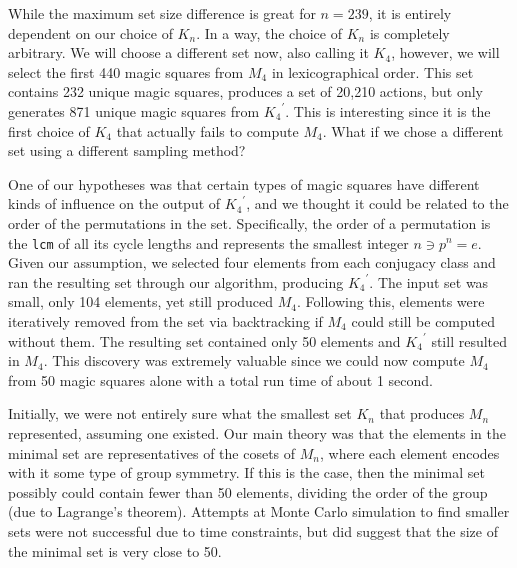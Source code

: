 \documentclass[12pt]{report}
\begin{document}
\par While the maximum set size difference is great for $n=239$, it is entirely dependent on our
choice of $K_n$. In a way, the choice of $K_n$ is completely arbitrary. We will choose a different
set now, also calling it $K_4$, however, we will select the first 440 magic squares from $M_4$ in
lexicographical order. This set contains 232 unique magic squares, produces a set of 20,210
actions, but only generates 871 unique magic squares from ${K_4}^\prime$. This is interesting since
it is the first choice of $K_4$ that actually fails to compute $M_4$. What if we chose a different
set using a different sampling method?

\par One of our hypotheses was that certain types of magic squares have different kinds of
influence on the output of ${K_4}^\prime$, and we thought it could be related to the order of the
permutations in the set. Specifically, the order of a permutation is the \texttt{lcm} of all its
cycle lengths and represents the smallest integer $n \ni p^n = e$. Given our assumption, we
selected four elements from each conjugacy class and ran the resulting set through our algorithm,
producing ${K_4}^\prime$. The input set was small, only 104 elements, yet still produced $M_4$.
Following this, elements were iteratively removed from the set via backtracking if $M_4$ could
still be computed without them. The resulting set contained only 50 elements and ${K_4}^\prime$
still resulted in $M_4$. This discovery was extremely valuable since we could now compute $M_4$
from 50 magic squares alone with a total run time of about 1 second.

\par Initially, we were not entirely sure what the smallest set $K_n$ that produces $M_n$
represented, assuming one existed. Our main theory was that the elements in the minimal set are
representatives of the cosets of $M_n$, where each element encodes with it some type of group
symmetry. If this is the case, then the minimal set possibly could contain fewer than 50 elements,
dividing the order of the group (due to Lagrange's theorem). Attempts at Monte Carlo simulation to
find smaller sets were not successful due to time constraints, but did suggest that the size of the
minimal set is very close to 50.
\end{document}
